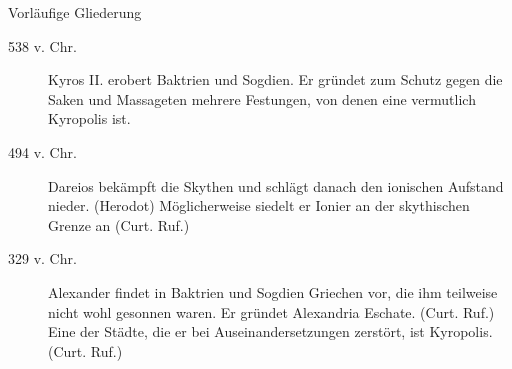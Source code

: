 Vorläufige Gliederung

\begin{description}
	\item[538 v. Chr.] 
		Kyros II. erobert Baktrien und Sogdien.
		Er gründet zum Schutz gegen die Saken und Massageten mehrere Festungen,
			von denen eine vermutlich Kyropolis ist.
	\item[494 v. Chr.] 
		Dareios bekämpft die Skythen und schlägt danach den ionischen Aufstand nieder. (Herodot)
		Möglicherweise siedelt er Ionier an der skythischen Grenze an (Curt. Ruf.)
	\item[329 v. Chr.]
		Alexander findet in Baktrien und Sogdien Griechen vor,
			die ihm teilweise nicht wohl gesonnen waren.
		Er gründet Alexandria Eschate. (Curt. Ruf.)
		Eine der Städte,
			die er bei Auseinandersetzungen zerstört,
			ist Kyropolis. (Curt. Ruf.)


\end{description}
